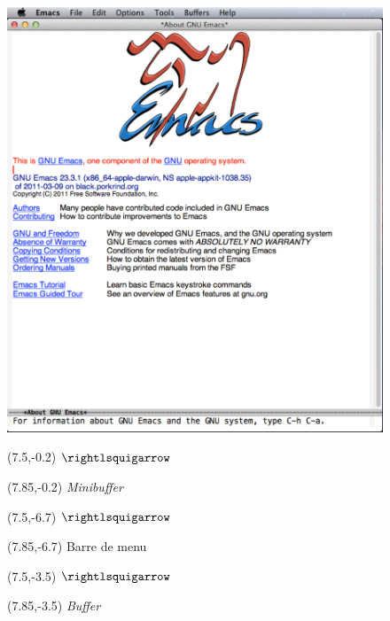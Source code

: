 \begin{figure}[t]
  \includegraphics{emacswindow-screenshot}

  \begin{textblock}{0.35}(7.5,-0.2)
    \LARGE$\rightlsquigarrow$
  \end{textblock}
  \begin{textblock}{1.75}(7.85,-0.2)
    \small \emph{Minibuffer}
  \end{textblock}

  \begin{textblock}{0.35}(7.5,-6.7)
    \LARGE$\rightlsquigarrow$
  \end{textblock}
  \begin{textblock}{1.75}(7.85,-6.7)
    \small Barre de menu
  \end{textblock}

  \begin{textblock}{0.35}(7.5,-3.5)
    \LARGE$\rightlsquigarrow$
  \end{textblock}
  \begin{textblock}{1.75}(7.85,-3.5)
    \small \emph{Buffer}
  \end{textblock}


\end{figure}
